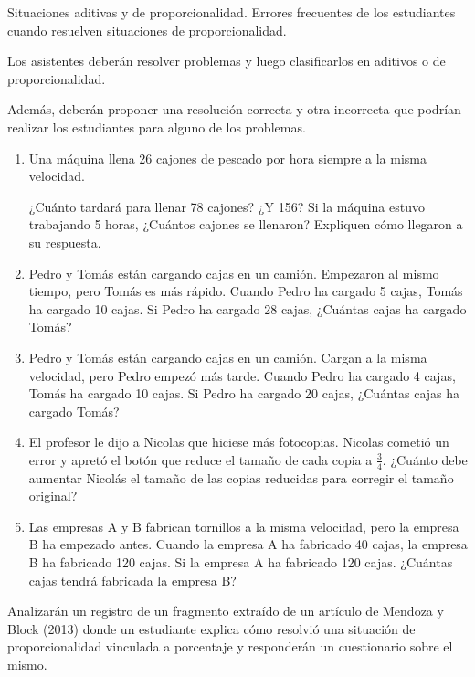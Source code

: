 \documentclass[oneside,spanish]{amsart}
\numberwithin{equation}{section}
\numberwithin{figure}{section}
\begin{document}
\begin{description}[itemsep=10pt]
    \item[Contenidos] Situaciones aditivas y de proporcionalidad. Errores frecuentes de los estudiantes cuando resuelven situaciones de proporcionalidad.
    
    \item[Actividad 1] Los asistentes deberán resolver problemas y luego clasificarlos en aditivos o de proporcionalidad.

    Además, deberán proponer una resolución correcta y otra incorrecta que podrían realizar los estudiantes para alguno de los problemas.
    \begin{enumerate}[label=\alph*), itemsep=10pt]
      \item Una máquina llena 26 cajones de pescado por hora siempre a la misma velocidad.
      
      ¿Cuánto tardará para llenar 78 cajones? ¿Y 156? Si la máquina estuvo trabajando 5 horas, ¿Cuántos cajones se llenaron? Expliquen cómo llegaron a su respuesta.
      \item Pedro y Tomás están cargando cajas en un camión. Empezaron al mismo tiempo, pero Tomás es más rápido. Cuando Pedro ha cargado 5 cajas, Tomás ha cargado 10 cajas. Si Pedro ha cargado 28 cajas, ¿Cuántas cajas ha cargado Tomás?
      \item Pedro y Tomás están cargando cajas en un camión. Cargan a la misma velocidad, pero Pedro empezó más tarde. Cuando Pedro ha cargado 4 cajas, Tomás ha cargado 10 cajas. Si   Pedro ha cargado 20   cajas, ¿Cuántas cajas ha cargado Tomás?
      \item El profesor le dijo a Nicolas que hiciese más fotocopias. Nicolas cometió un error y apretó el botón que reduce el tamaño de cada copia a  $\frac{3}{4}$. ¿Cuánto debe aumentar Nicolás el tamaño de las copias reducidas para corregir el tamaño original?
      \item Las empresas A y B fabrican tornillos a la misma velocidad, pero la empresa B ha empezado antes. Cuando la empresa A ha fabricado 40 cajas, la empresa B ha fabricado 120 cajas. Si la empresa A ha fabricado 120 cajas. ¿Cuántas cajas tendrá fabricada la empresa B?
    \end{enumerate}
    
    \item[Actividad 2] Analizarán un registro de un fragmento extraído de un artículo de Mendoza y Block (2013) donde un estudiante explica cómo resolvió una situación de proporcionalidad vinculada a porcentaje y responderán un cuestionario sobre el mismo.
\end{description}
\end{document}
